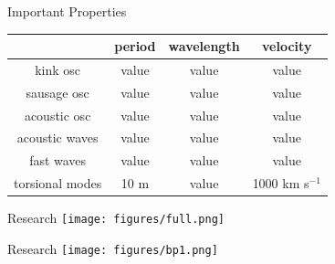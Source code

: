 \documentclass[table]{beamer}
\begin{document}

\begin{frame}{Important Properties}
    \begin{center}
        \begin{tabular}{c|c|c|c|}
            \cline{2-4} & {\textbf{period}} &
                {\textbf{wavelength}} &
                {\textbf{velocity}}\\
            \hline \multicolumn{0}{|c|}{kink osc} & value & value & value\\
            \hline \multicolumn{0}{|c|}{sausage osc} & value & value & value\\
            \hline \multicolumn{0}{|c|}{acoustic osc} & value & value & value\\
            \hline \multicolumn{0}{|c|}{acoustic waves} & value & value & value\\
            \hline \multicolumn{0}{|c|}{fast waves} & value & value & value\\
            \hline \multicolumn{0}{|c|}{torsional modes} & 10 m & value &
                1000 km s$^{-1}$\\
            \hline
        \end{tabular}
    \end{center}
\end{frame}%
\begin{frame}{Research}
    \texttt{[image: figures/full.png]}
\end{frame}%
\begin{frame}{Research}
    \texttt{[image: figures/bp1.png]}
\end{frame}%
\end{document}
